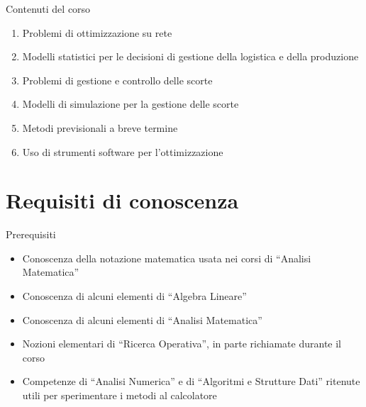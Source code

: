 \documentclass{beamer}
\begin{document}
\begin{frame}{Contenuti del corso}
  \begin{enumerate}
    \item Problemi di ottimizzazione su rete%
    \item Modelli statistici per le decisioni di gestione della logistica e della produzione

    \item Problemi di gestione e controllo delle scorte

    \item Modelli di simulazione per la gestione delle scorte

    \item Metodi previsionali a breve termine

    \item  Uso di strumenti software per l'ottimizzazione
  \end{enumerate}
\end{frame}

\section{Requisiti di conoscenza}

\begin{frame}{Prerequisiti}
  \begin{itemize}
  \item Conoscenza della notazione matematica usata nei corsi di ``Analisi Matematica''
  \item Conoscenza di alcuni elementi di ``Algebra Lineare''
  \item Conoscenza di alcuni elementi di ``Analisi Matematica''
  \item Nozioni elementari di ``Ricerca Operativa'', in parte richiamate durante il corso
  \item Competenze di ``Analisi Numerica'' e di ``Algoritmi e Strutture Dati'' ritenute utili per sperimentare i metodi al calcolatore
  \end{itemize}
\end{frame}

\end{document}

